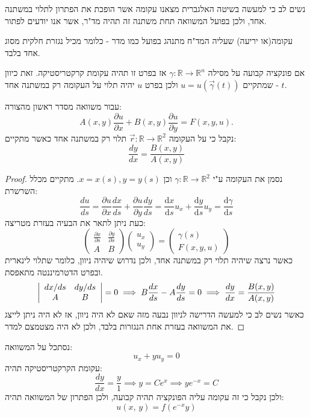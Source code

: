 \documentclass{tstextbook}
\begin{document}
\begin{remark}
נשים לב כי למעשה בשיטה האלגברית מצאנו עקומה אשר הופכת את הפתרון לתלוי במשתנה אחד, ולכן בפועל המשוואה תחת משתנה זה תהיה מד"ר, אשר אנו יודעים לפתור.

\end{remark}
\begin{definition}[קרקטריסטיקה]
עקומה(או יריעה) שעליה המד"ח מתנהג בפועל כמו מדר - כלומר מכיל נגזרת חלקית מסוג אחד בלבד.

\end{definition}
\begin{proposition}
אם פונקציה קבועה על מסילה \(\gamma:\mathbb{R}\to \mathbb{R}^{n}\) אז בפרט זו תהיה עקומת קרקטריסטיקה. זאת כיוון שמתקיים \(u=u\left( \vec{\gamma}(t) \right)\) ולכן בפרט \(u\) יהיה תלוי על העקומה רק במשתנה אחד - \(t\).

\end{proposition}
\begin{proposition}
עבור משוואה מסדר ראשון מהצורה:
$$A(x,y)\frac{\partial u}{\partial x}+B(x,y)\frac{\partial u}{\partial y}=F(x,y,u).$$
נקבל כי על העקומה \(\vec{r}:\mathbb{R}\to \mathbb{R}^{2}\) תלוי רק במשתנה אחד כאשר מתקיים:
$$\frac{d y}{d x}=\frac{B(x,y)}{A(x,y)}$$

\end{proposition}
\begin{proof}
נסמן את העקומה ע"י \(\gamma:\mathbb{R}\to \mathbb{R}^{2}\) וכן \(x=x(s),y=y(s)\). מתקיים מכלל השרשרת:
$${\frac{d u}{d s}}={\frac{\partial u}{\partial x}}{\frac{d x}{d s}}+{\frac{\partial u}{\partial y}}{\frac{d y}{d s}}=\frac{\mathrm{d} x}{\mathrm{d} s} u_{x}+\frac{\mathrm{d} y}{\mathrm{d} s} u_{y}=\frac{\mathrm{d} \gamma}{\mathrm{d} s} $$
כעת ניתן לתאר את הבעיה בעזרת מטריצה:
$$\begin{pmatrix}\frac{\partial x}{\partial s}  & \frac{\partial y}{\partial s} \\ A & B\end{pmatrix}\begin{pmatrix}u_{x}\\u_{y}\end{pmatrix}=\begin{pmatrix}\gamma(s)\\F(x,y,u)
\end{pmatrix}$$
כאשר נרצה שיהיה תלוי רק במשתנה אחד, ולכן נדרוש שיהיה ניוון, כלומר שתלוי לינארית ובפרט הדטרמיננטה מתאפסת.
$$\left|\begin{array}{c c}{{d x/d s}}&{{d y/d s}}\\ {{A}}&{{B}}\end{array}\right|=0\implies B\frac{d x}{d s}-A\frac{d y}{d s}=0\implies \frac{d y}{d x}=\frac{B(x,y)}{A(x,y)}$$
כאשר נשים לב כי למעשה הדרישה לניוון נבעה מזה שאם לא היה ניוון, אז לא היה ניתן לייצג את המשוואה בעזרת אחת הנגזרות בלבד, ולכן לא היה מצטמצם למדר.

\end{proof}
\begin{example}
נסתכל על המשוואה:
$$u_{x}+y u_{y}=0$$
עקומת הקרקטריסטיקה תהיה:
$$\frac{d y}{d x}=\frac{y}{1}\implies y=Ce^{ x }\implies ye^{ -x }=C$$
ולכן נקבל כי זה עקומה עליה הפונקציה תהיה קבועה, ולכן הפתרון של המשוואה תהיה:
$$u(x,\,y)=f(e^{-x}y)$$

\end{example}
\end{document}
